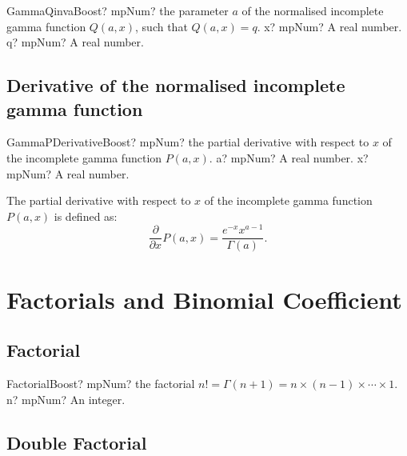 \vspace{0.6cm}
\begin{mpFunctionsExtract}
	\mpFunctionTwo
	{GammaQinvaBoost? mpNum? the parameter $a$ of the normalised incomplete gamma function $Q(a,x)$, such that $Q(a,x) = q$.}
	{x? mpNum? A real number.}
	{q? mpNum? A real number.}
\end{mpFunctionsExtract}








\subsection{Derivative  of the normalised incomplete gamma function}

\begin{mpFunctionsExtract}
	\mpFunctionTwo
	{GammaPDerivativeBoost? mpNum? the partial derivative with respect to $x$ of the incomplete gamma function $P(a,x)$.}
	{a? mpNum? A real number.}
	{x? mpNum? A real number.}
\end{mpFunctionsExtract}

\vspace{0.3cm}
The partial derivative with respect to $x$ of the incomplete gamma function $P(a,x)$ is defined as:
\begin{equation}
	\frac{\partial}{\partial x}P(a,x) = \frac{e^{-x} x^{a-1}}{\Gamma(a)}.
\end{equation}




\section{Factorials and Binomial Coefficient}

\subsection{Factorial}

\begin{mpFunctionsExtract}
	\mpFunctionOne
	{FactorialBoost? mpNum? the factorial $n! = \Gamma(n+1) = n \times (n-1) \times \cdots \times 1$.}
	{n? mpNum? An integer.}
\end{mpFunctionsExtract}



\subsection{Double Factorial}

